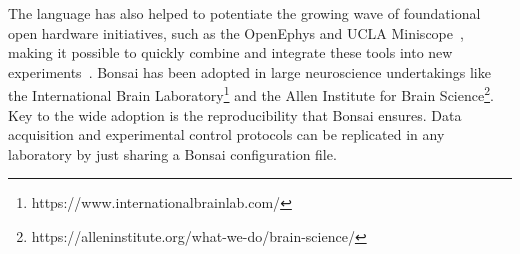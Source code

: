 The language has also helped to potentiate the growing wave of foundational
open hardware initiatives, such as the OpenEphys \citep{siegleEtAl17} and UCLA
Miniscope~\citep{caiEtAl16}, making it possible to quickly combine and
integrate these tools into new experiments~\citep{buccinoEtAl18}.
%
Bonsai has been adopted in large neuroscience undertakings like the
International Brain
Laboratory\footnote{https://www.internationalbrainlab.com/}
and the Allen Institute for Brain
Science\footnote{https://alleninstitute.org/what-we-do/brain-science/}.
%
Key to the wide adoption is the reproducibility that Bonsai ensures.  Data acquisition and experimental control protocols can be 
replicated in any laboratory by just sharing a Bonsai configuration file. 
%


